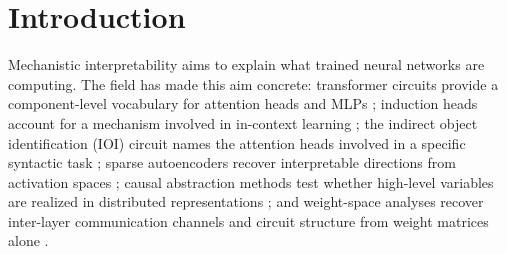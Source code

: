\documentclass{article}
\begin{document}
\section{Introduction}

Mechanistic interpretability aims to explain what trained neural
networks are computing.  The field has made this aim concrete:
transformer circuits provide a component-level vocabulary for attention
heads and MLPs \citep{elhage2021}; induction heads account for a
mechanism involved in in-context learning \citep{olsson2022}; the
indirect object identification (IOI) circuit names the attention heads
involved in a specific syntactic task \citep{wang2022}; sparse
autoencoders recover interpretable directions from activation spaces
\citep{bricken2023,templeton2024}; causal abstraction methods test
whether high-level variables are realized in distributed representations
\citep{geiger2021,geiger2024}; and weight-space analyses recover
inter-layer communication channels and circuit structure from weight
matrices alone \citep{merullo2024,elhage2021}.
\end{document}
